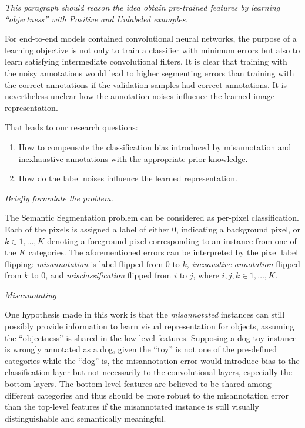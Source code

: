 \noindent
\textit{This paragraph should reason the idea obtain pre-trained features by learning ``objectness'' with Positive and Unlabeled examples.}

\noindent
For end-to-end models contained convolutional neural networks, the purpose of a learning objective is not only to train a classifier with minimum errors but also to learn satisfying intermediate convolutional filters.
It is clear that training with the noisy annotations would lead to higher segmenting errors than training with the correct annotations if the validation samples had correct annotations. It is nevertheless unclear how the annotation noises influence the learned image representation.

\noindent
That leads to our research questions:
\begin{enumerate}
  \item How to compensate the classification bias introduced by misannotation and inexhaustive annotations with the appropriate prior knowledge.
  \item How do the label noises influence the learned representation.
\end{enumerate}


\noindent
\textit{Briefly formulate the problem.}

\noindent
The Semantic Segmentation problem can be considered as per-pixel classification. Each of the pixels is assigned a label of either $0$, indicating a background pixel, or $k \in {1, \ldots, K}$ denoting a foreground pixel corresponding to an instance from one of the $K$ categories.
The aforementioned errors can be interpreted by the pixel label flipping:
\textit{misannotation} is label flipped from $0$ to $k$, \textit{inexaustive annotation} flipped from $k$ to $0$, and \textit{misclassification} flipped from $i$ to $j$, where $i, j, k \in {1, \ldots, K}$.

\noindent
\textit{Misannotating}

\noindent
One hypothesis made in this work is that the \textit{misannotated} instances can still possibly provide information to learn visual representation for objects, assuming the ``objectness'' is shared in the low-level features.
Supposing a dog toy instance is wrongly annotated as a dog, given the ``toy'' is not one of the pre-defined categories while the ``dog'' is, the misannotation error would introduce bias to the classification layer but not necessarily to the convolutional layers, especially the bottom layers.
The bottom-level features are believed to be shared among different categories and thus should be more robust to the misannotation error than the top-level features if the misannotated instance is still visually distinguishable and semantically meaningful.


